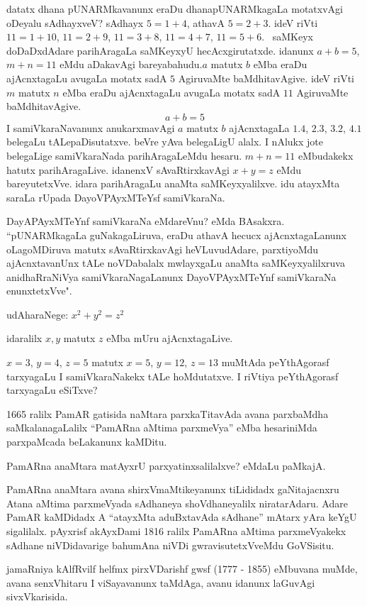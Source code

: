 datatx dhana pUNARMkavanunx eraDu dhanapUNARMkagaLa motatxvAgi oDeyalu sAdhayxveV? sAdhayx $5=1+4$, athavA $5=2+3$. ideV riVti $11=1+10$, $11=2+9$,  $11=3+8$, $11=4+7$, $11=5+6$.~ saMKeyx doDaDxdAdare parihAragaLa saMKeyxyU hecAcxgirutatxde. idanunx $a+b=5$, $m+n=11$ eMdu aDakavAgi bareyabahudu.\break $a$\; matutx \;$b$\; eMba eraDu ajAcnxtagaLu avugaLa motatx sadA $5$ AgiruvaMte baMdhitavAgive. ideV riVti \;$m$\; matutx \;$n$\; eMba eraDu ajAcnxtagaLu avugaLa motatx sadA $11$ AgiruvaMte baMdhitavAgive.
\setlength{\abovedisplayskip}{3pt}
\setlength{\belowdisplayskip}{3pt}
$$
a+b=5
$$
I samiVkaraNavanunx anukarxmavAgi $a$ matutx $b$ ajAcnxtagaLa $1.4$, $2.3$, $3.2$, $4.1$ belegaLu tALepaDisutatxve. beVre yAva belegaLigU alalx. I nAlukx jote belegaLige samiVkaraNada parihAragaLeMdu hesaru. $m+n=11$ eMbudakekx hatutx parihAragaLive. idanenxV sAvaRtirxkavAgi  $x+y=z$ eMdu bareyutetxVve. idara parihAragaLu anaMta saMKeyxyalilxve. idu atayxMta saraLa rUpada DayoVPAyxMTeYsf samiVkaraNa.

DayAPAyxMTeYnf samiVkaraNa eMdareVnu? eMda BAsakxra. ``pUNARMkagaLa guNaka\-gaLiruva, eraDu athavA hecucx ajAcnxtagaLanunx oLagoMDiruva matutx sAvaRtirxka\-vAgi heVLuvudAdare, parxtiyoMdu ajAcnxtavanUnx tALe noVDabalalx mwlayxgaLu anaMta saMKeyxyalilxruva anidhaRraNiVya samiVkaraNagaLanunx DayoVPAyxMTeYnf samiVkaraNa enunxtetxVve".

udAharaNege: \quad $x^2+y^2=z^2$

idaralilx $x,y$ matutx $z$ eMba mUru ajAcnxtagaLive. 

$x=3$, $y=4$, $z=5$ matutx $x=5$, $y=12$, $z=13$ muMtAda peYthAgorasf tarxyagaLu I samiVkaraNakekx tALe hoMdutatxve. I riVtiya peYthAgorasf tarxyagaLu eSiTxve? 

{\rm 1665} ralilx PamAR gatisida naMtara parxkaTitavAda avana parxbaMdha saMkalanagaLalilx ``PamARna aMtima parxmeVya'' eMba hesariniMda parxpaMcada beLakanunx kaMDitu.

PamARna anaMtara matAyxrU parxyatinxsalilalxve? eMdaLu paMkajA.

PamARna anaMtara avana shirxVmaMtikeyanunx tiLididadx gaNitajacnxru Atana aMtima parxmeVyada sAdhaneya shoVdhaneyalilx niratarAdaru. Adare PamAR kaMDidadx A ``atayxMta aduBxtavAda sAdhane'' mAtarx yAra keYgU sigalilalx. pAyxrisf akAyxDami {\rm 1816} ralilx PamARna aMtima parxmeVyakekx sAdhane niVDidavarige bahumAna niVDi gwravisutetxVveMdu  GoVSisitu.

jamaRniya kAlfRvilf helfmx pirxVDarishf gwsf {\rm (1777 - 1855)} eMbuvana muMde, avana senxVhitaru I viSayavanunx taMdAga, avanu idanunx laGuvAgi sivxVkarisida.

